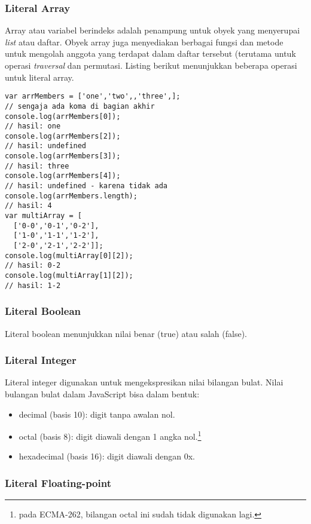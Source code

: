 \subsubsection{Literal Array}

Array atau variabel berindeks adalah penampung untuk obyek yang menyerupai \textit{list} atau daftar. Obyek array juga menyediakan berbagai fungsi dan metode untuk mengolah anggota yang terdapat dalam daftar tersebut (terutama untuk operasi \textit{traversal} dan permutasi. Listing berikut menunjukkan beberapa operasi untuk literal array.

\lstset{language=JavaScript,caption=Array di JavaScript}
\begin{lstlisting}
var arrMembers = ['one','two',,'three',];
// sengaja ada koma di bagian akhir
console.log(arrMembers[0]);
// hasil: one
console.log(arrMembers[2]);
// hasil: undefined
console.log(arrMembers[3]);
// hasil: three
console.log(arrMembers[4]);
// hasil: undefined - karena tidak ada
console.log(arrMembers.length);
// hasil: 4
var multiArray = [
  ['0-0','0-1','0-2'],
  ['1-0','1-1','1-2'],
  ['2-0','2-1','2-2']];
console.log(multiArray[0][2]);
// hasil: 0-2
console.log(multiArray[1][2]);
// hasil: 1-2
\end{lstlisting}

\subsubsection{Literal Boolean}

Literal boolean menunjukkan nilai benar (true) atau salah (false).

\subsubsection{Literal Integer}

Literal integer digunakan untuk mengekspresikan nilai bilangan bulat. Nilai bulangan bulat dalam JavaScript bisa dalam bentuk:
\begin{itemize}
  \item decimal (basis 10): digit tanpa awalan nol.
  \item octal (basis 8): digit diawali dengan 1 angka nol.\footnote{pada ECMA-262, bilangan octal ini sudah tidak digunakan lagi.}
  \item hexadecimal (basis 16): digit diawali dengan 0x.
\end{itemize}

\subsubsection{Literal Floating-point}

